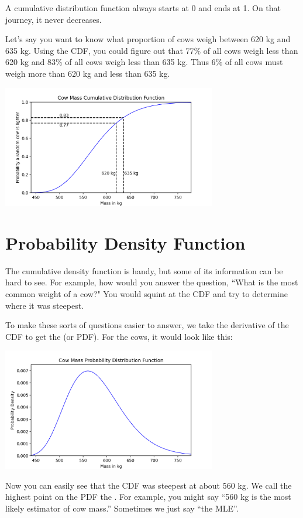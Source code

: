 A cumulative distribution function always starts at 0 and ends at 1.  On that journey, it never decreases.

Let's say you want to know what proportion of cows weigh between 620 kg and 635 kg.  Using the CDF, you could figure out that 77\% of all cows weigh less than 620 kg and 83\% of all cows 
weigh less than 635 kg.  Thus 6\% of all cows must weigh more than 620 kg and less than 635 kg.

\includegraphics[width=0.7\textwidth]{cow_cdf_bounds.png}

\section{Probability Density Function}

The cumulative density function is handy,  but some of its information can be hard to see.  For example, how would you answer the question, ``What is the most common weight of a cow?"  You would
squint at the CDF and try to determine where it was steepest.

To make these sorts of questions easier to answer,  we take the derivative of the CDF to get the  (or PDF).  For the cows,  it would look like this:

\includegraphics[width=0.7\textwidth]{cow_pdf.png}

Now you can easily see that the CDF was steepest at about 560 kg.  We call the highest point on the PDF the .  For example, you might say ``560 kg is the most likely estimator of cow mass.''  Sometimes we just say ``the MLE''.

